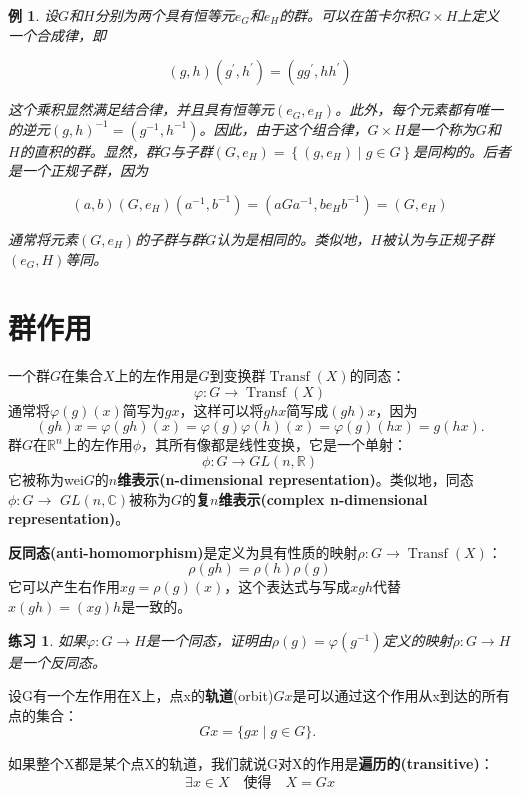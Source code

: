 \documentclass[hyperref,UTF8]{ctexbook}
\newtheorem{eg}{例}[chapter]
\newtheorem*{exercise}{练习}
\begin{document}
\begin{eg}
设$G$和$H$分别为两个具有恒等元$e_{G}$和$e_{H}$的群。可以在笛卡尔积$G \times H$上定义一个合成律，即

$$
(g, h)\left(g^{\prime}, h^{\prime}\right)=\left(g g^{\prime}, h h^{\prime}\right)
$$

这个乘积显然满足结合律，并且具有恒等元$\left(e_{G}, e_{H}\right)$。此外，每个元素都有唯一的逆元$(g, h)^{-1}=\left(g^{-1}, h^{-1}\right)$。因此，由于这个组合律，$G \times H$是一个称为$G$和$H$的直积的群。显然，群$G$与子群$\left(G, e_{H}\right)=\left\{\left(g, e_{H}\right) \mid g \in G\right\}$是同构的。后者是一个正规子群，因为

$$
(a, b)\left(G, e_{H}\right)\left(a^{-1}, b^{-1}\right)=\left(a G a^{-1}, b e_{H} b^{-1}\right)=\left(G, e_{H}\right)
$$

通常将元素$\left(G, e_{H}\right)$的子群与群$G$认为是相同的。类似地，$H$被认为与正规子群$\left(e_{G}, H\right)$等同。
\end{eg}
\section{群作用}\label{sec:2.6}
一个群$G$在集合$X$上的左作用是$G$到变换群$\operatorname{Transf}(X)$的同态：
$$
\varphi: G \rightarrow \operatorname{Transf}(X)
$$
通常将$\varphi(g)(x)$简写为$g x$，这样可以将$g h x$简写成$(g h) x$，因为
$$
(g h) x=\varphi(g h)(x)=\varphi(g) \varphi(h)(x)=\varphi(g)(h x)=g(h x) .
$$
群$G$在$\mathbb{R}^{n}$上的左作用$\phi$，其所有像都是线性变换，它是一个单射：
$$
\phi: G \rightarrow G L(n, \mathbb{R})
$$
它被称为wei$G$的\textbf{$n$维表示(n-dimensional representation)}。类似地，同态$\phi: G \rightarrow$ $G L(n, \mathbb{C})$被称为$G$的\textbf{复$n$维表示(complex n-dimensional representation)}。

\textbf{反同态(anti-homomorphism)}是定义为具有性质的映射$\rho: G \rightarrow \operatorname{Transf}(X)$：
$$
\rho(g h)=\rho(h) \rho(g)
$$
它可以产生右作用$x g=\rho(g)(x)$，这个表达式与写成$x g h$代替$x(g h)=(x g) h$是一致的。
\begin{exercise}
    如果$\varphi: G \rightarrow H$是一个同态，证明由$\rho(g)=\varphi\left(g^{-1}\right)$定义的映射$\rho: G \rightarrow H$是一个反同态。 

\end{exercise}
设G有一个左作用在X上，点x的\textbf{轨道}(orbit)$G x$是可以通过这个作用从x到达的所有点的集合： 
$$
G x=\{g x \mid g \in G\} \text {. }
$$ 

如果整个X都是某个点X的轨道，我们就说G对X的作用是\textbf{遍历的(transitive)}： 
$$
\exists x \in X \quad \text {使得} \quad X=G x
$$ 
\end{document}
